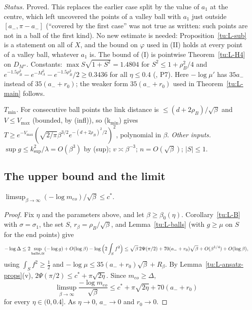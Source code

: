 \noindent\emph{Status.} Proved. This replaces the earlier case split by the value of $a_1$ at the centre, which left uncovered
the points of a valley ball with $a_1$ just outside $[a_-,\pi-a_-]$ (``covered by the first case'' was not true as written: such
points are not in a ball of the first kind). No new estimate is needed: Proposition~\ref{tu:L-sub} is a statement on all of $X$,
and the bound on $\varphi$ used in (II) holds at every point of a valley ball, whatever $a_1$ is. The bound of (I) is pointwise
Theorem~\ref{tu:L-H4} on $D_{M''}$. Constants: $\max S\sqrt{1+S^2}=1.4804$ for $S^2\le1+\rho_B^2/4$ and
$e^{-1.5\rho_B^2}-e^{-M_A^2}-e^{-1.5\rho_B^2}/2\ge0.3436$ for all $\eta\le0.4$ (, P7). Here $-\log\mu'$ has
$35a_-$ instead of $35(a_-+r_0)$; the weaker form $35(a_-+r_0)$ used in Theorem~\ref{tu:L-main} follows.

\noindent\emph{$T_{\min}$.} For consecutive ball points the link distance is $\le(d+2\rho_B)/\sqrt\beta$ and $V\le V_{\max}$ (bounded,
by (infl)), so (k$_{\min}$) gives $T\ge e^{-V_{\max}}(\sqrt{2/\pi}\beta^{3/2}e^{-(d+2\rho_B)^2/2})^2$, polynomial in $\beta$.
\emph{Other inputs.} $\sup g\le k_{\sup}^2/\lambda=O(\beta^3)$ by (sup); $v\asymp\beta^{-3}$; $n=O(\sqrt\beta)$; $|S|\le1$.

\subsection{The upper bound and the limit}

\begin{theorem}\label{tu:L-main}
$\limsup_{\beta\to\infty}(-\log m_{eo})/\sqrt\beta\le c^*$.
\end{theorem}

\begin{proof}
Fix $\eta$ and the parameters above, and let $\beta\ge\beta_0(\eta)$. Corollary~\ref{tu:L-B} with $\sigma=\sigma_1$, the set $S$,
$r_\beta=\rho_B/\sqrt\beta$, and Lemma~\ref{tu:L-balls} (with $g\ge\mu$ on $S$ for the end points) give
\[
-\log\Delta\le2\sup_{\rm balls\cup S}(-\log g)+O(\log\beta)-\log\Big(2\int_Sf^2\Big)
\le\sqrt\beta\,2\Psi(\pi/2)+70(a_-+r_0)\sqrt\beta+O(\beta^{1/4})+O(\log\beta),
\]
using $\int_Sf^2\ge\frac12$ and $-\log\mu\le35(a_-+r_0)\sqrt\beta+R_\beta$. By Lemma~\ref{tu:L-ansatz-props}(v),
$2\Psi(\pi/2)\le c^*+\pi\sqrt{2\eta}$. Since $m_{eo}\ge\Delta$,
\[
\limsup_{\beta\to\infty}\frac{-\log m_{eo}}{\sqrt\beta}\le c^*+\pi\sqrt{2\eta}+70(a_-+r_0)
\]
for every $\eta\in(0,0.4]$. As $\eta\to0$, $a_-\to0$ and $r_0\to0$.
\end{proof}

